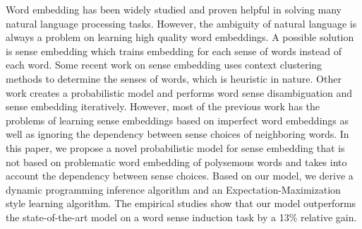 Word embedding has been widely studied and proven helpful in solving many natural language processing tasks. However, the ambiguity of natural language is always a problem on learning high quality word embeddings. A possible solution is sense embedding which trains embedding for each sense of words instead of each word. Some recent work on sense embedding uses context clustering methods to determine the senses of words, which is heuristic in nature. Other work creates a probabilistic model and performs word sense disambiguation and sense embedding iteratively. However, most of the previous work has the problems of learning sense embeddings based on imperfect word embeddings as well as ignoring the dependency between sense choices of neighboring words. In this paper, we propose a novel probabilistic model for sense embedding that is not based on problematic word embedding of polysemous words and takes into account the dependency between sense choices. Based on our model, we derive a dynamic programming inference algorithm and an Expectation-Maximization style learning algorithm. The empirical studies show that our model outperforms the state-of-the-art model on a word sense induction task by a 13\% relative gain.
